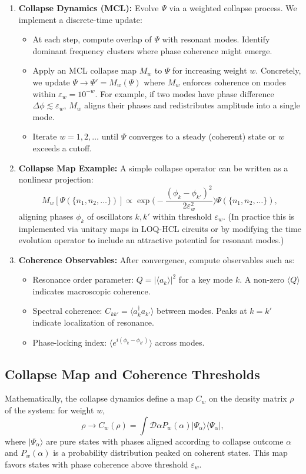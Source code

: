 \documentclass[11pt,a4paper]{article}
\begin{document}
\begin{enumerate}
\item \textbf{Collapse Dynamics (MCL):} Evolve $\Psi$ via a weighted collapse process. We implement a discrete-time update:
\begin{itemize}
\item At each step, compute overlap of $\Psi$ with resonant modes. Identify dominant frequency clusters where phase coherence might emerge.
\item Apply an MCL collapse map $M_w$ to $\Psi$ for increasing weight $w$. Concretely, we update $\Psi \to \Psi' = M_w(\Psi)$ where $M_w$ enforces coherence on modes within $\varepsilon_w = 10^{-w}$. For example, if two modes have phase difference $\Delta\phi \lesssim \varepsilon_w$, $M_w$ aligns their phases and redistributes amplitude into a single mode.
\item Iterate $w=1,2,\dots$ until $\Psi$ converges to a steady (coherent) state or $w$ exceeds a cutoff.
\end{itemize}
\item \textbf{Collapse Map Example:} A simple collapse operator can be written as a nonlinear projection:
\begin{equation}
M_w[\Psi(\{n_1,n_2,\dots\})] \propto \exp\Big(-\frac{(\phi_{k}-\phi_{k'})^2}{2\varepsilon_w^2}\Big) \Psi(\{n_1,n_2,\dots\}),
\end{equation}
aligning phases $\phi_k$ of oscillators $k,k'$ within threshold $\varepsilon_w$. (In practice this is implemented via unitary maps in LOQ-HCL circuits or by modifying the time evolution operator to include an attractive potential for resonant modes.)
\item \textbf{Coherence Observables:} After convergence, compute observables such as:
\begin{itemize}
\item Resonance order parameter: $Q = |\langle a_k \rangle|^2$ for a key mode $k$. A non-zero $\langle Q \rangle$ indicates macroscopic coherence.
\item Spectral coherence: $C_{kk'} = \langle a_k^\dagger a_{k'} \rangle$ between modes. Peaks at $k=k'$ indicate localization of resonance.
\item Phase-locking index: $\langle e^{i(\phi_k-\phi_{k'})} \rangle$ across modes.
\end{itemize}
\end{enumerate}

\subsection{Collapse Map and Coherence Thresholds}
\label{subsec:collapse_map_coherence_detailed}
Mathematically, the collapse dynamics define a map $C_w$ on the density matrix $\rho$ of the system: for weight $w$,
\begin{equation}
\rho \to C_w(\rho) = \int \mathcal{D}\alpha P_w(\alpha) |\Psi_\alpha\rangle\langle\Psi_\alpha|,
\end{equation}
where $|\Psi_\alpha\rangle$ are pure states with phases aligned according to collapse outcome $\alpha$ and $P_w(\alpha)$ is a probability distribution peaked on coherent states. This map favors states with phase coherence above threshold $\varepsilon_w$.
\end{document}
